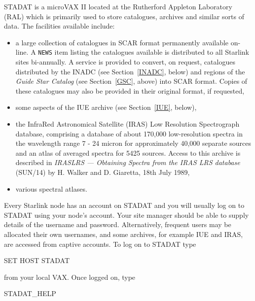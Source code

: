 \documentclass[twoside,11pt,nolof]{starlink}
\begin{document}
STADAT is a microVAX II located at the Rutherford Appleton Laboratory
(RAL) which is primarily used to store catalogues, archives and similar
sorts of data. The facilities available include:

\begin{itemize}

  \item a large collection of catalogues in SCAR format permanently
   available on-line. A \verb-NEWS- item listing the catalogues
   available is distributed to all Starlink sites bi-annually. A service
   is provided to convert, on request, catalogues distributed by the
   INADC (see Section~\ref{INADC}, below) and regions of the \textit{Guide Star Catalog} (see Section~\ref{GSC}, above) into SCAR
   format. Copies of these catalogues may also be provided in their
   original format, if requested,

  \item some aspects of the IUE archive (see Section~\ref{IUE}, below),

  \item the InfraRed Astronomical Satellite (IRAS) Low Resolution
   Spectrograph database, comprising a database of about 170,000
   low-resolution spectra in the wavelength range 7 - 24 micron for
   approximately 40,000 separate sources and an atlas of averaged
   spectra for 5425 sources. Access to this archive is described in
   \textit{IRASLRS --- Obtaining Spectra from the IRAS LRS database}
   (SUN/14) by H. Walker and D. Giaretta, 18th July 1989,

  \item various spectral atlases.

\end{itemize}

Every Starlink node has an account on STADAT and you will usually log on
to STADAT using your node's account. Your site manager should be able to
supply details of the username and password. Alternatively, frequent
users may be allocated their own usernames, and some archives, for
example IUE and IRAS, are accessed from captive accounts. To log on to
STADAT type

\begin{terminalv}
    SET  HOST  STADAT
\end{terminalv}

from your local VAX. Once logged on, type

\begin{terminalv}
    STADAT_HELP
\end{terminalv}
\end{document}
